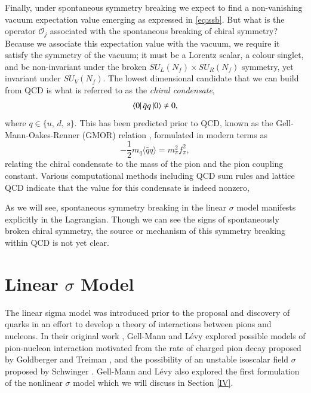 \documentclass[aps,prd,onecolumn,showpacs,amsmath,amssymb,nofootinbib]{revtex4} \pdfoutput=1
\begin{document}
Finally, under spontaneous symmetry breaking we expect to find a non-vanishing vacuum expectation value emerging as expressed in \eqref{eq:ssb}. But what is the operator $\mathcal{O}_j$ associated with the spontaneous breaking of chiral symmetry? Because we associate this expectation value with the vacuum, we require it satisfy the symmetry of the vacuum; it must be a Lorentz scalar, a colour singlet, and be non-invariant under the broken ${S\!U}_L(N_f)\times {S\!U}_R(N_f)$ symmetry, yet invariant under ${S\!U}_V(N_f)$. The lowest dimensional candidate that we can build from QCD is what is referred to as the \textit{chiral condensate},
\begin{equation}
    \label{chiral-condensate}
    \bra{0} \bar{q} q \ket{0} \neq 0,
\end{equation}
where $q \in \{u,\,d,\,s\}$. This has been predicted prior to QCD, known as the Gell-Mann-Oakes-Renner (GMOR) relation \cite{GMOR}, formulated in modern terms as
\begin{equation}
    \label{GMOR}
     -\frac{1}{2} m_q \langle \bar{q} q \rangle = m_\pi^{2} f^{2}_\pi,
\end{equation}
relating the chiral condensate to the mass of the pion and the pion coupling constant. Various computational methods including QCD sum rules \cite{Dosch1998} and lattice QCD \cite{Fukaya2010} indicate that the value for this condensate is indeed nonzero, 

As we will see, spontaneous symmetry breaking in the linear $\sigma$ model manifests explicitly in the Lagrangian. Though we can see the signs of spontaneously broken chiral symmetry, the  source or mechanism of this symmetry breaking  within QCD is not yet clear. 


\section{Linear $\sigma$ Model}\label{III}

The linear sigma model was introduced prior to the proposal and discovery of quarks in an effort to develop a theory of interactions between pions and nucleons. In their original work \cite{GellMann1960}, Gell-Mann and L\'evy explored possible models of pion-nucleon interaction motivated from the rate of charged pion decay proposed by Goldberger and Treiman \cite{Goldberger1958}, and the possibility of an unstable isoscalar field $\sigma$ proposed by Schwinger \cite{Schwinger1957}. Gell-Mann and L\'evy also explored the first formulation of the nonlinear $\sigma$ model which we will discuss in Section \ref{IV}.
\end{document}
